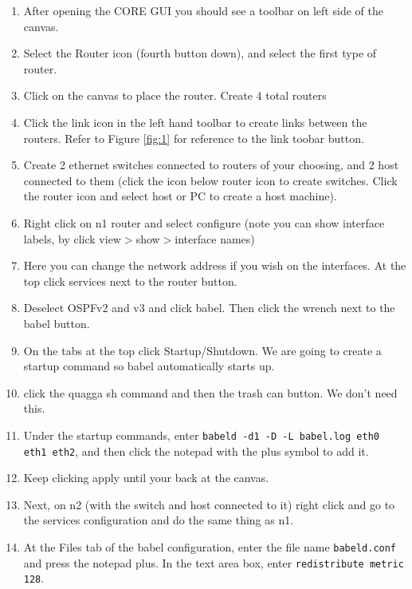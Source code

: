 \documentclass[main.tex]{subfiles}
\begin{document}
\begin{enumerate}[noitemsep,label=$\bullet$,leftmargin=20mm,labelsep=0.5cm]

\item After opening the CORE GUI you should see a toolbar on left side of the canvas.
\item Select the Router icon (fourth button down), and select the first type of router.
\item Click on the canvas to place the router.  Create 4 total routers
\item Click the link icon in the left hand toolbar to create links between the routers. Refer to Figure \ref{fig:1} for reference to the link toobar button.

\item  Create 2 ethernet switches connected to routers of your choosing, and 2 host connected to them (click the icon below router icon to create switches.  Click the router icon and select host or PC to create a host machine).
\item  Right click on n1 router and select configure (note you can show interface labels, by click view$>$show$>$interface names)

\item Here you can change the network address if you wish on the interfaces.  At the top click services next to the router button.

\item Deselect OSPFv2 and v3 and click babel.  Then click the wrench next to the babel button.
\item On the tabs at the top click Startup/Shutdown.  We are going to create a startup command so babel automatically starts up.
\item click the quagga sh command and then the trash can button.  We don't need this.
\item Under the startup commands, enter \texttt{babeld -d1 -D -L babel.log eth0 eth1 eth2}, and then click the notepad with the plus symbol to add it.
\item Keep clicking apply until your back at the canvas.

\item Next, on n2 (with the switch and host connected to it) right click and go to the services configuration and do the same thing as n1.

\item At the Files tab of the babel configuration, enter the file name \texttt{babeld.conf} and press the notepad plus.  In the text area box, enter \texttt{redistribute metric 128}.


\end{enumerate}
\end{document}

